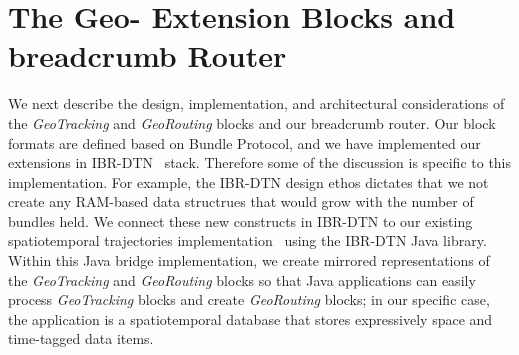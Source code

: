 \documentclass{sig-alternate}
\begin{document}
\CopyrightYear
\crdata










%
%




%
%

\section{The Geo- Extension Blocks and {\sc breadcrumb} Router}
We next describe the design, implementation, and architectural
considerations of the {\em GeoTracking} and {\em GeoRouting} blocks
and our {\sc breadcrumb} router.
Our block formats are defined based on Bundle Protocol, and we have implemented our extensions
in IBR-DTN~\cite{IBR-DTN-WASA} stack. Therefore some of the
discussion is specific to this implementation.
For example, the IBR-DTN design ethos dictates that we not create
any RAM-based data structrues that would grow with the number of
bundles held.  We connect these new constructs in IBR-DTN to our
existing spatiotemporal trajectories
implementation~\cite{michel12:spatiotemporal} using the IBR-DTN Java
library. Within this Java bridge implementation, we create mirrored
representations of the {\em GeoTracking} and {\em GeoRouting} blocks
so that Java applications can easily process {\em GeoTracking} blocks
and create {\em GeoRouting} blocks; in our specific case, the
application is a spatiotemporal database that stores expressively
space and time-tagged data items.
\end{document}

